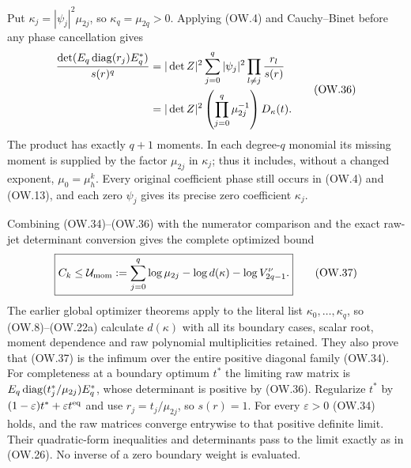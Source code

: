 Put $\kappa_j=|\psi_j|^2\mu_{2j}$, so $\kappa_q=\mu_{2q}>0$.
Applying (OW.4) and Cauchy--Binet before any phase cancellation gives
\[
 \begin{split}
 \frac{\det(E_q\operatorname{diag}(r_j)E_q^*)}{s(r)^q}
 &=|\det Z|^2\sum_{j=0}^q|\psi_j|^2
                 \prod_{l\ne j}\frac{r_l}{s(r)}\\
 &=|\det Z|^2\left(\prod_{j=0}^q\mu_{2j}^{-1}\right)
            D_\kappa(t).
 \end{split}                                                  \tag{OW.36}
\]
The product has exactly $q+1$ moments. In each degree-$q$ monomial
its missing moment is supplied by the factor $\mu_{2j}$ in $\kappa_j$;
thus it includes, without a changed exponent, $\mu_0=\mu_h^k$.
Every original coefficient phase still occurs in (OW.4) and (OW.13),
and each zero $\psi_j$ gives its precise zero coefficient $\kappa_j$.

Combining (OW.34)--(OW.36) with the numerator comparison and the exact
raw-jet determinant conversion gives the complete optimized bound
\[
 \boxed{C_k\le\mathcal U_{\rm mom}:=
   \sum_{j=0}^q\log\mu_{2j}-\log d(\kappa)-\log V_{2q-1}^\nu.}
 \tag{OW.37}
\]
The earlier global optimizer theorems apply to the literal list
$\kappa_0,\ldots,\kappa_q$, so (OW.8)--(OW.22a) calculate $d(\kappa)$
with all its boundary cases, scalar root, moment dependence and raw
polynomial multiplicities retained. They also prove that (OW.37) is
the infimum over the entire positive diagonal family (OW.34).
For completeness at a boundary optimum $t^*$ the limiting raw matrix is
$E_q\operatorname{diag}(t_j^*/\mu_{2j})E_q^*$, whose determinant is positive by
(OW.36). Regularize $t^*$ by $(1-\varepsilon)t^*+
\varepsilon t^{\rm eq}$ and use $r_j=t_j/\mu_{2j}$, so $s(r)=1$.
For every $\varepsilon>0$ (OW.34) holds, and the raw matrices converge
entrywise to that positive definite limit. Their quadratic-form
inequalities and determinants pass to the limit exactly as in (OW.26).
No inverse of a zero boundary weight is evaluated.

